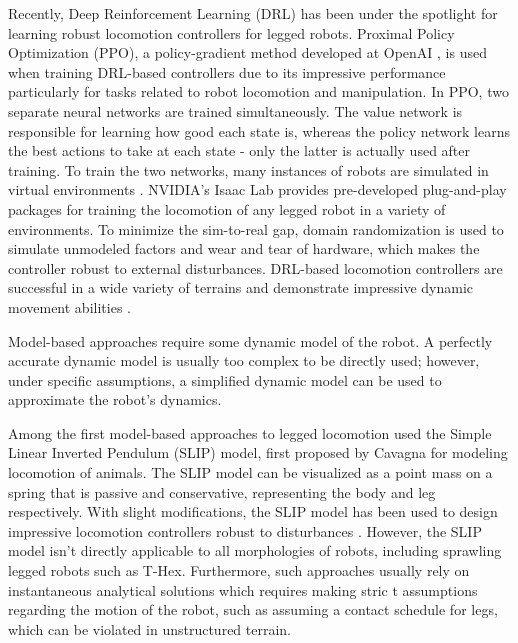 Recently, Deep Reinforcement Learning (DRL) has been under the spotlight for learning robust locomotion controllers for legged robots. Proximal Policy Optimization (PPO), a policy-gradient method developed at OpenAI \cite{schulmanProximalPolicyOptimization2017}, is used when training DRL-based controllers due to its impressive performance particularly for tasks related to robot locomotion and manipulation. In PPO, two separate neural networks are trained simultaneously. The value network is responsible for learning how good each state is, whereas the policy network learns the best actions to take at each state - only the latter is actually used after training. To train the two networks, many instances of robots are simulated in virtual environments \cite{rudinLearningWalkMinutes2022}. NVIDIA's Isaac Lab \cite{nvidiaIsaacLabGPUAccelerated2025} provides pre-developed plug-and-play packages for training the locomotion of any legged robot in a variety of environments. To minimize the sim-to-real gap, domain randomization is used to simulate unmodeled factors and wear and tear of hardware, which makes the controller robust to external disturbances. DRL-based locomotion controllers are successful in a wide variety of terrains and demonstrate impressive dynamic movement abilities \cite{tahaDevelopingHexapodLocomotion2025, mikiLearningRobustPerceptive2022, leeLearningQuadrupedalLocomotion2020, choiLearningQuadrupedalLocomotion2023, margolisRapidLocomotionReinforcement2022, tanSimtoRealLearningAgile2018, rudinCatlikeJumpingLanding2022, rudinAdvancedSkillsLearning2022, nahrendraDreamWaQLearningRobust2023, kimDeepReinforcementLearning2026}.

Model-based approaches require some dynamic model of the robot. A perfectly accurate dynamic model is usually too complex to be directly used; however, under specific assumptions, a simplified dynamic model can be used to approximate the robot's dynamics. 

Among the first model-based approaches to legged locomotion used the Simple Linear Inverted Pendulum (SLIP) model, first proposed by Cavagna \cite{cavagnaMechanicalWorkTerrestrial1977} for modeling locomotion of animals. The SLIP model can be visualized as a point mass on a spring that is passive and conservative, representing the body and leg respectively. With slight modifications, the SLIP model has been used to design impressive locomotion controllers robust to disturbances \cite{raibertTrottingPacingBounding1990, RunningFourLegs, poulakakisStabilityPassiveDynamics2006}. However, the SLIP model isn't directly applicable to all morphologies of robots, including sprawling legged robots such as T-Hex. Furthermore, such approaches usually rely on instantaneous analytical solutions which requires making stric t assumptions regarding the motion of the robot, such as assuming a contact schedule for legs, which can be violated in unstructured terrain.

